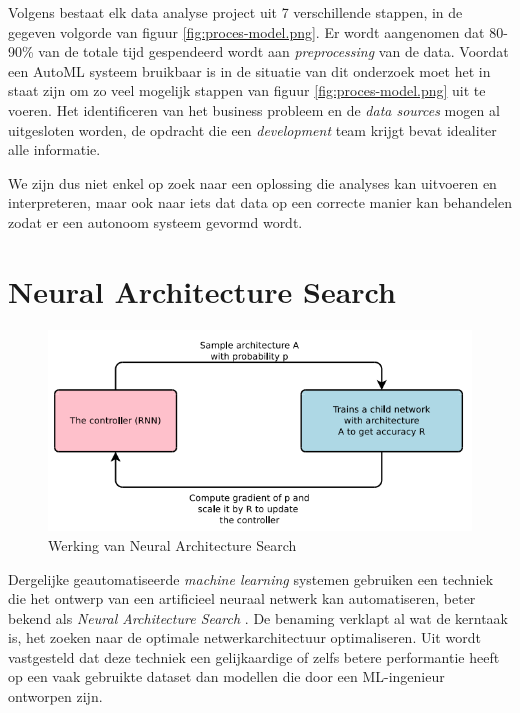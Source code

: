 Volgens \textcite{Lemahieu2018} bestaat elk data analyse project uit 7 verschillende stappen, in de gegeven volgorde van figuur \ref{fig:proces-model.png}. Er wordt aangenomen dat 80-90\% van de totale tijd gespendeerd wordt aan \textit{preprocessing} van de data. Voordat een AutoML systeem bruikbaar is in de situatie van dit onderzoek moet het in staat zijn om zo veel mogelijk stappen van figuur \ref{fig:proces-model.png} uit te voeren. Het identificeren van het business probleem en de \textit{data sources} mogen al uitgesloten worden, de opdracht die een \textit{development} team krijgt bevat idealiter alle informatie. 

We zijn dus niet enkel op zoek naar een oplossing die analyses kan uitvoeren en interpreteren, maar ook naar iets dat data op een correcte manier kan behandelen zodat er een autonoom systeem gevormd wordt. 

\section{Neural Architecture Search}
\label{sec:nas}

\begin{figure}
    \includegraphics[width=\linewidth]{img/nas.png}
    \caption{Werking van Neural Architecture Search \autocite{ZophL2016}}
    \label{fig:nas-bp}
\end{figure}

Dergelijke geautomatiseerde \textit{machine learning} systemen gebruiken een techniek die het ontwerp van een artificieel neuraal netwerk kan automatiseren, beter bekend als \textit{Neural Architecture Search} \autocite{Elsken2019}. De benaming verklapt al wat de kerntaak is, het zoeken naar de optimale netwerkarchitectuur optimaliseren. Uit \textcite{ZophL2016} wordt vastgesteld dat deze techniek een gelijkaardige of zelfs betere performantie heeft op een vaak gebruikte dataset dan modellen die door een ML-ingenieur ontworpen zijn.

